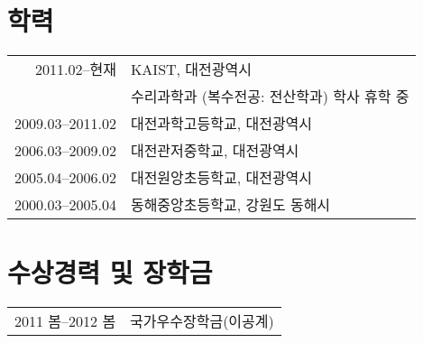 \documentclass[a4paper,10pt]{article}
\begin{document}
\section{학력}
\begin{tabular}{rl}
  2011.02--현재 & KAIST, 대전광역시 \\
  & \textsc{수리과학과} (복수전공: \textsc{전산학과}) 학사 휴학 중 \\
  2009.03--2011.02 & 대전과학고등학교, 대전광역시 \\
  2006.03--2009.02 & 대전관저중학교, 대전광역시 \\
  2005.04--2006.02 & 대전원앙초등학교, 대전광역시 \\
  2000.03--2005.04 & 동해중앙초등학교, 강원도 동해시
\end{tabular}

\section{수상경력 및 장학금}
\begin{tabular}{rl}
  2011 봄--2012 봄 & 국가우수장학금(이공계)
\end{tabular}

\end{document}
